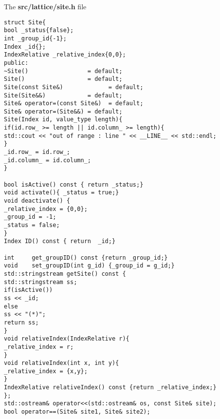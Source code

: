
The \textbf{src/lattice/site.h} file

\begin{lstlisting}[style=CStyle]
struct Site{
bool _status{false};
int _group_id{-1};
Index _id{};
IndexRelative _relative_index{0,0};
public:
~Site()                 = default;
Site()                  = default;
Site(const Site&)             = default;
Site(Site&&)            = default;
Site& operator=(const Site&)  = default;
Site& operator=(Site&&) = default;
Site(Index id, value_type length){
if(id.row_ >= length || id.column_ >= length){
std::cout << "out of range : line " << __LINE__ << std::endl;
}
_id.row_ = id.row_;
_id.column_ = id.column_;
}

bool isActive() const { return _status;}
void activate(){ _status = true;}
void deactivate() {
_relative_index = {0,0};
_group_id = -1;
_status = false;
}
Index ID() const { return  _id;}

int     get_groupID() const {return _group_id;}
void    set_groupID(int g_id) {_group_id = g_id;}
std::stringstream getSite() const {
std::stringstream ss;
if(isActive())
ss << _id;
else
ss << "(*)";
return ss;
}
void relativeIndex(IndexRelative r){
_relative_index = r;
}
void relativeIndex(int x, int y){
_relative_index = {x,y};
}
IndexRelative relativeIndex() const {return _relative_index;}
};
std::ostream& operator<<(std::ostream& os, const Site& site);
bool operator==(Site& site1, Site& site2);
\end{lstlisting}
